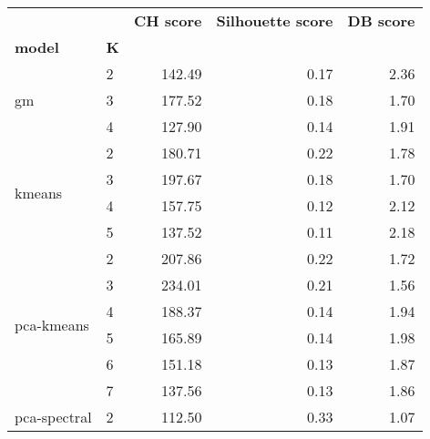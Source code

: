 \begin{tabular}{llrrr}
\toprule
                                 &            & \textbf{CH score} & \textbf{Silhouette score} & \textbf{DB score} \\
\textbf{model}                   & \textbf{K} &                   &                           &                   \\
\midrule
\multirow[c]{3}{*}{gm}           & 2          & 142.49            & 0.17                      & 2.36              \\
                                 & 3          & 177.52            & 0.18                      & 1.70              \\
                                 & 4          & 127.90            & 0.14                      & 1.91              \\
\midrule
\multirow[c]{4}{*}{kmeans}       & 2          & 180.71            & 0.22                      & 1.78              \\
                                 & 3          & 197.67            & 0.18                      & 1.70              \\
                                 & 4          & 157.75            & 0.12                      & 2.12              \\
                                 & 5          & 137.52            & 0.11                      & 2.18              \\
\midrule
\multirow[c]{6}{*}{pca-kmeans}   & 2          & 207.86            & 0.22                      & 1.72              \\
                                 & 3          & 234.01            & 0.21                      & 1.56              \\
                                 & 4          & 188.37            & 0.14                      & 1.94              \\
                                 & 5          & 165.89            & 0.14                      & 1.98              \\
                                 & 6          & 151.18            & 0.13                      & 1.87              \\
                                 & 7          & 137.56            & 0.13                      & 1.86              \\
\midrule
\multirow[c]{6}{*}{pca-spectral} & 2          & 112.50            & 0.33                      & 1.07              \\

\end{tabular}
